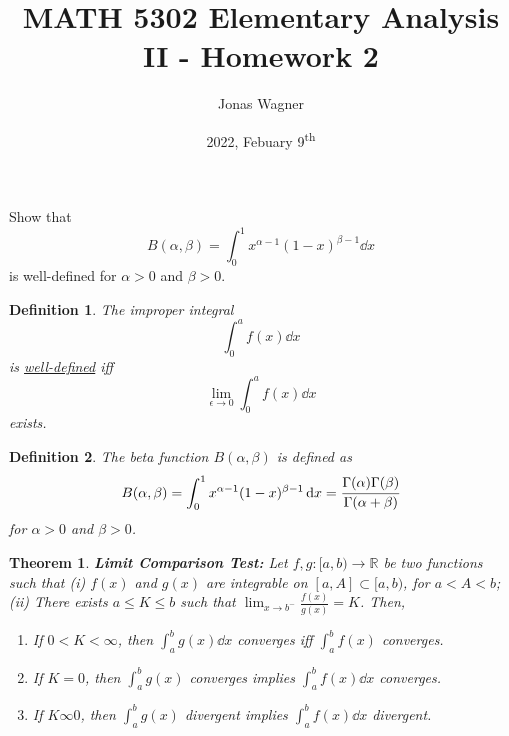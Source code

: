 \documentclass[]{article}
\title{MATH 5302 Elementary Analysis II - Homework 2}
\author{Jonas Wagner}
\date{2022, Febuary 9\textsuperscript{th}}
\newcommand{\R}{\mathbb{R}}
\newtheorem{definition}{Definition}
\newtheorem{theorem}{Theorem}
\begin{document}
\maketitle

\section{}
Show that\[
    B(\alpha,\beta) = \int_0^1 x^{\alpha-1} (1-x)^{\beta-1} \dd{x}
\] is well-defined for $\alpha > 0$ and $\beta > 0$.

\begin{definition}
    The improper integral \[
        \int_{0}^{a} f(x) \dd{x}
    \] is \emph{\underline{well-defined}} iff\[
        \lim_{\epsilon \to 0} \int_{0}^{a} f(x) \dd{x}
    \] exists.
\end{definition}

\begin{definition}
    The beta function $B(\alpha, \beta)$ is defined as \[
        B(\alpha,\beta) = \int_0^1 x^{\alpha-1} (1-x)^{\beta-1} \dd{x}
            = \cfrac{\Gamma(\alpha)\Gamma(\beta)}{\Gamma(\alpha + \beta)}
    \] for $\alpha>0$ and $\beta>0$.
\end{definition}



\begin{theorem}\label{thm:limit_comp_test}
    \textbf{Limit Comparison Test:}
    Let $f,g:[a,b) \to \R$ be two functions such that 
    (i) $f(x)$ and $g(x)$ are integrable on $[a,A]\subset[a,b)$, for $a<A<b$;
    (ii) There exists $a \leq K \leq b$ such that $\lim_{x\to b^{-}} \frac{f(x)}{g(x)} = K$.
    Then,\begin{enumerate}
        \item If $0< K < \infty$, then $\int_a^b g(x) \dd{x}$ converges iff $\int_a^b f(x)$ converges.
        \item If $K = 0$, then $\int_a^b g(x)$ converges implies $\int_a^b f(x) \dd{x}$ converges.
        \item If $K \infty 0$, then $\int_a^b g(x)$ divergent implies $\int_a^b f(x) \dd{x}$ divergent.
    \end{enumerate}
\end{theorem}
\end{document}
